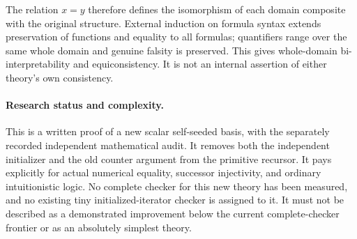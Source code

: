 The relation $x=y$ therefore defines the isomorphism of each domain
composite with the original structure. External induction on formula
syntax extends preservation of functions and equality to all formulas;
quantifiers range over the same whole domain and genuine falsity is
preserved. This gives whole-domain bi-interpretability and
equiconsistency. It is not an internal assertion of either theory's
own consistency.

\paragraph{Research status and complexity.}
This is a written proof of a new scalar self-seeded basis, with the
separately recorded independent mathematical audit. It removes both
the independent initializer and the old counter argument from the
primitive recursor. It pays explicitly for actual numerical equality,
successor injectivity, and ordinary intuitionistic
logic. No complete checker for this new theory has been measured,
and no existing tiny initialized-iterator checker is assigned to it.
It must not be described as a demonstrated improvement below the
current complete-checker frontier or as an absolutely simplest theory.
